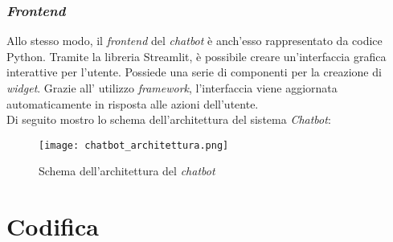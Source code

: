 \subsubsection{\textit{Frontend}}
Allo stesso modo, il \textit{frontend} del \textit{chatbot} è anch'esso rappresentato da codice Python. Tramite la libreria Streamlit, è possibile creare un'interfaccia grafica interattive per l'utente. Possiede una serie di componenti per la creazione di \textit{widget}. Grazie all' utilizzo \textit{framework}, l'interfaccia viene aggiornata automaticamente in risposta alle azioni dell'utente. \\
\noindent
Di seguito mostro lo schema dell'architettura del sistema \textit{Chatbot}:
\begin{figure}[H]
    \centering
    \texttt{[image: chatbot\_architettura.png]}
    \caption{Schema dell'architettura del \textit{chatbot}}
    \label{fig:architetturaChatbot}
\end{figure}

\section{Codifica}
